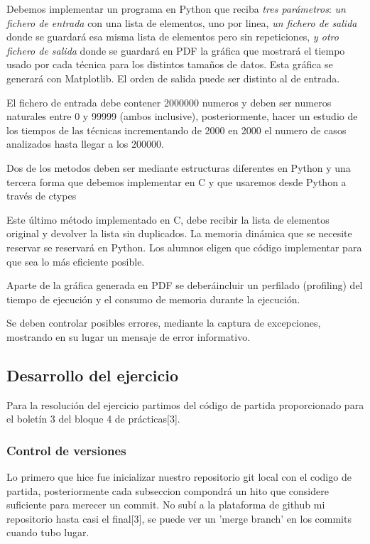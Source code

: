 \documentclass[10pt,journal,compsoc]{IEEEtran}
\begin{document}
Debemos implementar un programa en Python que reciba \emph{tres parámetros}: \emph{un fichero de entrada} con una lista de elementos, uno por linea, \emph{un fichero de salida} donde se guardará esa misma lista de elementos pero sin repeticiones, \emph{y otro fichero de salida} donde se guardará en PDF la gráfica que mostrará el tiempo usado por cada técnica para los distintos tamaños de datos. Esta gráfica se generará con Matplotlib. El orden de salida puede ser distinto al de entrada.

El fichero de entrada debe contener 2000000 numeros y deben ser numeros naturales entre 0 y 99999 (ambos inclusive), posteriormente, hacer un estudio de los tiempos de las técnicas incrementando de 2000 en 2000 el numero de casos analizados hasta llegar a los 200000.

Dos de los metodos deben ser mediante estructuras diferentes en Python y una tercera forma que debemos implementar en C y que usaremos desde Python a través de ctypes

Este último método implementado en C, debe recibir la lista de elementos original y devolver la lista sin duplicados. La memoria dinámica que se necesite reservar se reservará en Python. Los alumnos eligen que código implementar para que sea lo más eficiente posible.

Aparte de la gráfica generada en PDF se deberáincluir un perfilado (profiling) del tiempo de ejecución y el consumo de memoria durante la ejecución.

Se deben controlar posibles errores, mediante la captura de excepciones, mostrando en su lugar un mensaje de error informativo.

\subsection{Desarrollo del ejercicio}
Para la resolución del ejercicio partimos del código de partida proporcionado para el boletín 3 del bloque 4 de prácticas[3].
 
\subsubsection{Control de versiones}
Lo primero que hice fue inicializar nuestro repositorio git local con el codigo de partida, posteriormente cada subseccion compondrá un hito que considere suficiente para merecer un commit. No subí a la plataforma de github mi repositorio hasta casi el final[3], se puede ver un 'merge branch' en los commits cuando tubo lugar.
\end{document}
